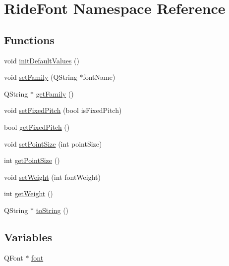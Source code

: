 \hypertarget{namespace_ride_font}{\section{Ride\-Font Namespace Reference}
\label{namespace_ride_font}
}
\subsection*{Functions}
\begin{DoxyCompactItemize}
\item 
void \hyperlink{namespace_ride_font_ae1a2ea291e5a7f33c84cbd5219b7a187}{init\-Default\-Values} ()
\item 
void \hyperlink{namespace_ride_font_aecc589296f14c6f3bf80e1228aa1b082}{set\-Family} (Q\-String $\ast$font\-Name)
\item 
Q\-String $\ast$ \hyperlink{namespace_ride_font_ac92f3004cffa8ba62e8bfa42d9b74c81}{get\-Family} ()
\item 
void \hyperlink{namespace_ride_font_ab85fcc5d44b7f024166eba501517e82b}{set\-Fixed\-Pitch} (bool is\-Fixed\-Pitch)
\item 
bool \hyperlink{namespace_ride_font_aa0dc79e821859703b94a7c81e28da266}{get\-Fixed\-Pitch} ()
\item 
void \hyperlink{namespace_ride_font_a3c7a01cd58b8145c965c57eee05f66bd}{set\-Point\-Size} (int point\-Size)
\item 
int \hyperlink{namespace_ride_font_ac613513651567db198b06c5a94b318bc}{get\-Point\-Size} ()
\item 
void \hyperlink{namespace_ride_font_a8b10d54b0df6366cbb3d39f4f5bcd71d}{set\-Weight} (int font\-Weight)
\item 
int \hyperlink{namespace_ride_font_a714379faf4a3c3f0b13bbf03c5cf5a04}{get\-Weight} ()
\item 
Q\-String $\ast$ \hyperlink{namespace_ride_font_aee28ee7dfadd414d022367823d1bf0bc}{to\-String} ()
\end{DoxyCompactItemize}
\subsection*{Variables}
\begin{DoxyCompactItemize}
\item 
Q\-Font $\ast$ \hyperlink{namespace_ride_font_a490a1d138dbd38b50c4fa67d5ae2242b}{font}
\end{DoxyCompactItemize}


